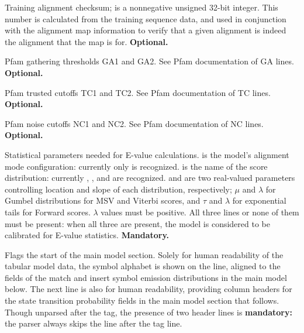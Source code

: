 \begin{sreitems}{}
\item [\monob{CKSUM <d>}] Training alignment checksum;  is
  a nonnegative unsigned 32-bit integer. This number is calculated
  from the training sequence data, and used in conjunction with the
  alignment map information to verify that a given alignment is indeed
  the alignment that the map is for. \textbf{Optional.}

\item [\monob{GA    <f> <f>}] Pfam gathering thresholds GA1 and GA2.
See Pfam documentation of GA lines. \textbf{Optional.}

\item [\monob{TC <f> <f>}] Pfam trusted cutoffs TC1 and TC2.  See
Pfam documentation of TC lines. \textbf{Optional.}

\item [\monob{NC <f> <f>}] Pfam noise cutoffs NC1 and NC2.  See Pfam
documentation of NC lines. \textbf{Optional.}

\item [\monob{STATS <s1> <s2> <f1> <f2>}] Statistical parameters
  needed for E-value calculations.  is the model's
  alignment mode configuration: currently only  is
  recognized.  is the name of the score distribution:
  currently , , and  are
  recognized.   and  are two real-valued
  parameters controlling location and slope of each distribution,
  respectively; $\mu$ and $\lambda$ for Gumbel distributions for MSV
  and Viterbi scores, and $\tau$ and $\lambda$ for exponential tails
  for Forward scores.  $\lambda$ values must be positive.  All three
  lines or none of them must be present: when all three are present,
  the model is considered to be calibrated for E-value
  statistics. \textbf{Mandatory.}

\item [\monob{HMM }] Flags the start of the main model
section. Solely for human readability of the tabular model data, the
symbol alphabet is shown on the  line, aligned to the fields
of the match and insert symbol emission distributions in the main
model below. The next line is also for human readability, providing
column headers for the state transition probability fields in the main
model section that follows. Though unparsed after the  tag,
the presence of two header lines is \textbf{mandatory:} the parser
always skips the line after the  tag line.


\end{sreitems}
